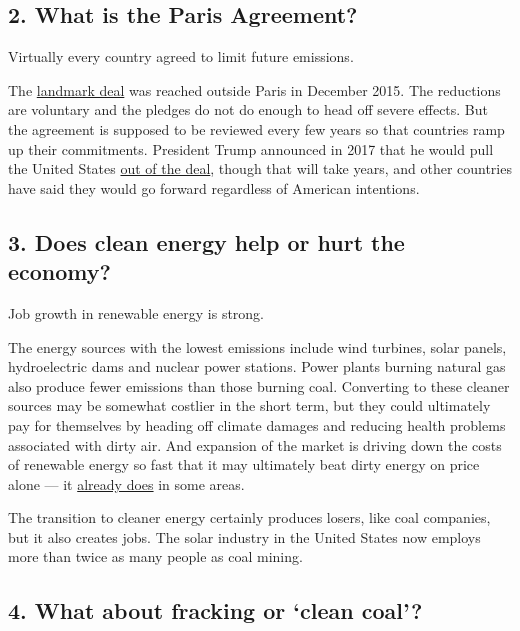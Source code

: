 \hypertarget{2-what-is-the-paris-agreement}{%
\subsection{2. What is the Paris
Agreement?}\label{2-what-is-the-paris-agreement}}

Virtually every country agreed to limit future emissions.

The
\href{https://www.nytimes3xbfgragh.onion/2015/12/13/world/europe/climate-change-accord-paris.html}{landmark
deal} was reached outside Paris in December 2015. The reductions are
voluntary and the pledges do not do enough to head off severe effects.
But the agreement is supposed to be reviewed every few years so that
countries ramp up their commitments. President Trump announced in 2017
that he would pull the United States
\href{https://www.nytimes3xbfgragh.onion/2017/06/01/climate/paris-climate-change-guide.html}{out
of the deal}, though that will take years, and other countries have said
they would go forward regardless of American intentions.

\hypertarget{3-does-clean-energy-help-or-hurt-the-economy}{%
\subsection{3. Does clean energy help or hurt the
economy?}\label{3-does-clean-energy-help-or-hurt-the-economy}}

Job growth in renewable energy is strong.

The energy sources with the lowest emissions include wind turbines,
solar panels, hydroelectric dams and nuclear power stations. Power
plants burning natural gas also produce fewer emissions than those
burning coal. Converting to these cleaner sources may be somewhat
costlier in the short term, but they could ultimately pay for themselves
by heading off climate damages and reducing health problems associated
with dirty air. And expansion of the market is driving down the costs of
renewable energy so fast that it may ultimately beat dirty energy on
price alone --- it
\href{https://www.nytimes3xbfgragh.onion/2017/06/06/climate/renewable-energy-push-is-strongest-in-the-reddest-states.html}{already
does} in some areas.

The transition to cleaner energy certainly produces losers, like coal
companies, but it also creates jobs. The solar industry in the United
States now employs more than twice as many people as coal mining.

\hypertarget{4-what-about-fracking-or-clean-coal}{%
\subsection{4. What about fracking or `clean
coal'?}\label{4-what-about-fracking-or-clean-coal}}

